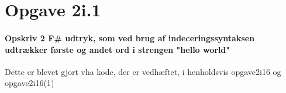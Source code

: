 \documentclass[a4paper]{article}
\begin{document}
\section*{Opgave 2i.1}

\paragraph*{Opskriv 2 F\# udtryk, som ved brug af indeceringssyntaksen udtrækker første og andet ord i strengen "hello world"\\}
Dette er blevet gjort vha kode, der er vedhæftet, i henholdsvis opgave2i16 og opgave2i16(1)
\end{document}
